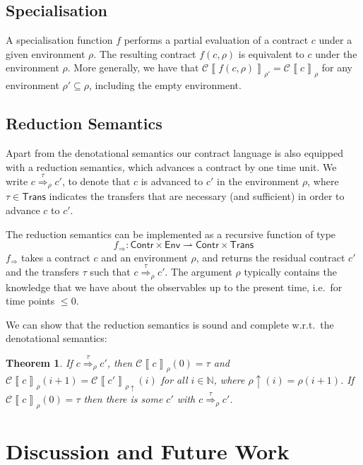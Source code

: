 \documentclass[a4paper,debug,twocolumn]{easychair}
\newcommand\type[1]{\mathsf{#1}}
\newcommand\nats{{\mathbb N}}
\newcommand\pto{\rightharpoonup}
\newcommand\cSem[2]{{\mathcal C}\left\llbracket#1\right\rrbracket_{#2}}
\newcommand\cRed[2]{\stackrel{#2}\Rightarrow_{#1}}
\newcommand\cRedFun{f_{\Rightarrow}}
\newcommand\envAdv[1]{#1\uparrow}
\theoremstyle{plain}
\newtheorem{theorem}{Theorem}
\begin{document}
\subsection{Specialisation}
\label{sec:specialisation}

A specialisation function $f$ performs a partial evaluation of a
contract $c$ under a given environment $\rho$. The resulting contract
$f(c,\rho)$ is equivalent to $c$ under the environment $\rho$. More
generally, we have that $\cSem{f(c,\rho)}{\rho'} = \cSem c \rho$ for
any environment $\rho' \subseteq \rho$, including the empty
environment.



\subsection{Reduction Semantics}
\label{sec:reduction-semantics}


Apart from the denotational semantics our contract language is also
equipped with a reduction semantics, which advances a contract by one
time unit. We write $c \cRed \rho \tau c'$, to denote that $c$ is
advanced to $c'$ in the environment $\rho$, where $\tau \in
\type{Trans}$ indicates the transfers that are necessary (and
sufficient) in order to advance $c$ to $c'$.

The reduction semantics can be implemented as a recursive function of
type 
\[
\cRedFun \colon\type{Contr}\times \type{Env} \pto \type{Contr} \times \type{Trans}
\]
$\cRedFun$ takes a contract $c$ and an environment $\rho$, and returns
the residual contract $c'$ and the transfers $\tau$ such that $c
\cRed\rho\tau c'$. The argument $\rho$ typically contains the
knowledge that we have about the observables up to the present time,
i.e.\ for time points $\leq 0$.

We can show that the reduction semantics is sound and complete w.r.t.\
the denotational semantics:
\begin{theorem}
  If $c \cRed\rho\tau c'$, then $\cSem c {\rho} (0) = \tau$ and $\cSem
  c {\rho} (i+1) = \cSem{c'}{\envAdv{\rho}}(i)$ for all $i \in \nats$,
  where $\envAdv{\rho} (i) = \rho(i+1)$. If $\cSem c \rho (0) = \tau$
  then there is some $c'$ with $c \cRed\rho\tau c'$.
\end{theorem}


\section{Discussion and Future Work}
\label{sec:disc-future-work}
\end{document}
